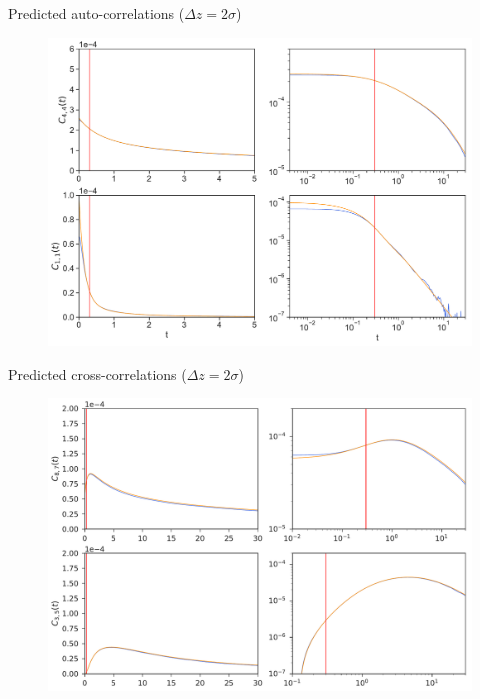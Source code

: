\documentclass{beamer}
\begin{document}
\begin{frame}{Predicted auto-correlations ($\Delta z=2\sigma$)}
\begin{figure}[h!]
\includegraphics[width=\linewidth]{Predictions-WALLS-17nodes-defense}
\end{figure}
\end{frame}

\begin{frame}{Predicted cross-correlations ($\Delta z=2\sigma$)}
\begin{figure}[h!]
\includegraphics[width=\linewidth]{PredictionsCross-WALLS-17nodes}
\end{figure}
\end{frame}
\end{document}
